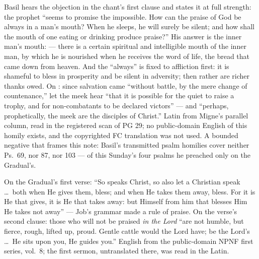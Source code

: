 \begin{witnessnote}
Basil hears the objection in the chant's first clause and states it at full
strength: the prophet ``seems to promise the impossible. How can the praise
of God be always in a man's mouth? When he sleeps, he will surely be silent;
and how shall the mouth of one eating or drinking produce praise?'' His
answer is the inner man's mouth:  --- there is a certain spiritual and
intelligible mouth of the inner man, by which he is nourished when he
receives the word of life, the bread that came down from heaven. And the
``always'' is fixed to affliction first: it is shameful to bless in
prosperity and be silent in adversity; then rather are richer thanks owed.
On : since salvation came ``without battle, by the
mere change of countenance,'' let the meek hear ``that it is possible for
the quiet to raise a trophy, and for non-combatants to be declared victors''
--- and ``perhaps, prophetically, the meek are the disciples of Christ.''
Latin from Migne's parallel column, read in the registered scan of PG 29; no
public-domain English of this homily exists, and the copyrighted FC
translation was not used. A bounded negative that frames this note: Basil's
transmitted psalm homilies cover neither Ps.\ 69, nor 87, nor 103 --- of
this Sunday's four psalms he preached only on the Gradual's.
\end{witnessnote}

\begin{witnessnote}
On the Gradual's first verse: ``So speaks Christ, so also let a Christian
speak \dots\ both when He gives them, bless; and when He takes them away,
bless. For it is He that gives, it is He that takes away: but Himself from
him that blesses Him He takes not away'' --- Job's grammar made a rule of
praise. On the verse's second clause: those who will not be praised
\textit{in the Lord} ``are not humble, but fierce, rough, lifted up, proud.
Gentle cattle would the Lord have; be the Lord's  \dots\ He
sits upon you, He guides you.'' English from the public-domain NPNF first
series, vol.~8; the first sermon, untranslated there, was read in the Latin.
\end{witnessnote}

